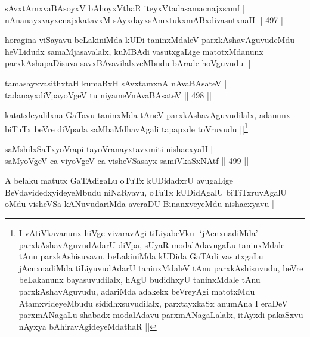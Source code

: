 
\begin{shl}
sAvxtAmxvaBAsoyxV bAhoyxV\s thaR iteyxVtadasamacnajxsamf | \\
nAnanayxvayxcnajxkatavxM sAyxdayxsAmxtukxmABxdivasutxnaH \hfill||  497 || 
\end{shl}

\begin{artha}
horagina viSayavu beLakiniMda kUDi taninxMdaleV parxkAshavAguvudeMdu heVLidudx samaMjasavalalx, kuMBAdi vasutxgaLige matotxMdanunx parxkAshapaDisuva savxBAvavilalxveMbudu bArade hoVguvudu ||
\end{artha}


\begin{shl}
tamasayxvasithxtaH kumaBxH sAvxtamxnA nAvaBAsateV | \\
tadanayxdiVpayoVgeV tu niyameVnAvaBAsateV \hfill||  498 ||  
\end{shl}

\begin{artha}
katatxleyalilxna GaTavu taninxMda tAneV parxkAshavAguvudilalx, adanunx biTuTx beVre diVpada saMbaMdhavAgali tapapxde toVruvudu ||\footnote{I vAtiVkavanunx hiVge vivaravAgi tiLiyabeVku- `jAcnxnadiMda' parxkAshavAguvudAdarU diVpa, sUyaR modalAdavugaLu taninxMdale tAnu parxkAshisuvavu. beLakiniMda kUDida GaTAdi vasutxgaLu jAcnxnadiMda tiLiyuvudAdarU taninxMdaleV tAnu parxkAshisuvudu, beVre beLakanunx bayasuvudilalx, hAgU budidhxyU taninxMdale tAnu parxkAshavAguvudu, adariMda adakekx beVreyAgi matotxMdu AtamxvideyeMbudu sididhxsuvudilalx, parxtayxkaSx anumAna I eraDeV parxmANagaLu shabadx modalAdavu parxmANagaLalalx, itAyxdi pakaSxvu nAyxya bAhiravAgideyeMdathaR ||}
\end{artha}


\begin{shl}
saMshilxSaTxyoVrapi tayoVranayxtavxmiti nishacxyaH | \\
saMyoVgeV ca viyoVgeV ca visheVSasayx samiVkaSxNAtf \hfill||  499 ||  
\end{shl}

\begin{artha}
A belaku matutx GaTAdigaLu oTuTx kUDidadxrU avugaLige BeVdavidedxyideyeMbudu niNaRyavu, oTuTx kUDidAgalU biTiTxruvAgalU oMdu visheVSa kANuvudariMda averaDU BinanxveyeMdu nishacxyavu ||
\end{artha}


